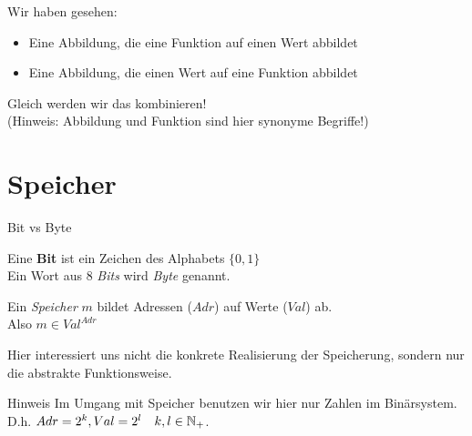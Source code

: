 \begin{frame}
	Wir haben gesehen:
	\begin{itemize}
		\item Eine Abbildung, die eine Funktion auf einen Wert abbildet
		\item Eine Abbildung, die einen Wert auf eine Funktion abbildet
	\end{itemize}
	Gleich werden wir das kombinieren!\\[1em]
	(Hinweis: Abbildung und Funktion sind hier synonyme Begriffe!)
\end{frame}

\section{Speicher}

\begin{frame}{Bit vs Byte}
	\begin{Definition}
		Eine \textbf{Bit} ist ein Zeichen des Alphabets $\{0, 1\}$ \\
		Ein Wort aus 8 \emph{Bits} wird \emph{Byte} genannt. 
	\end{Definition}
	\pause	
	
	\begin{Definition}
		Ein \emph{Speicher} $m$ bildet Adressen ($Adr$) auf Werte ($Val$) ab.\\
		Also $m \in Val^{Adr}$
	\end{Definition}
	Hier interessiert uns nicht die konkrete Realisierung der Speicherung, sondern nur die abstrakte Funktionsweise.
	\pause
	
	\begin{block}{Hinweis}
		Im Umgang mit Speicher benutzen wir hier nur Zahlen im Binärsystem. \\
		D.h. $Adr = 2^k, Val = 2^l \quad k,l \in \mathbb{N}_+$.
	\end{block}
\end{frame}

